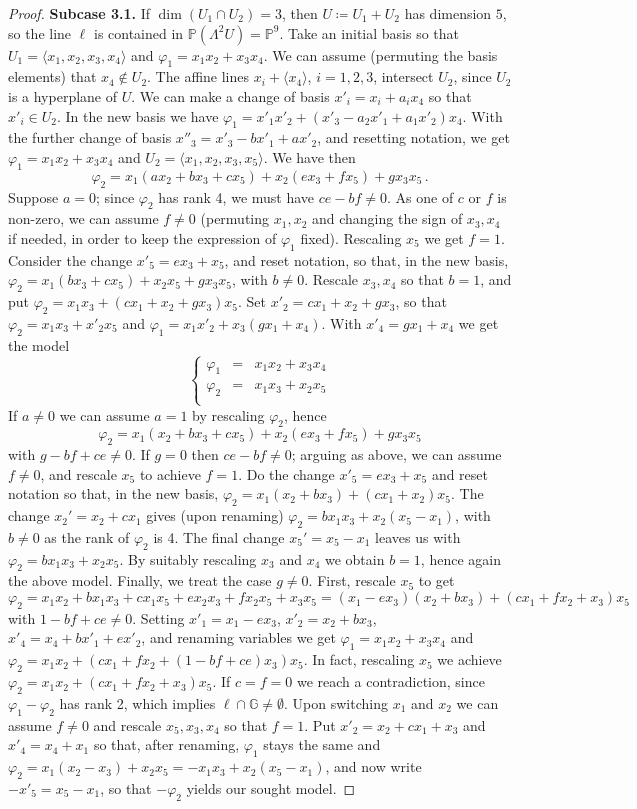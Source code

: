 \documentclass[10pt,reqno]{amsart}
\newcommand{\la}{\langle}
\newcommand{\ra}{\rangle}
\newcommand{\GG}{\mathbb{G}}
\newcommand{\RR}{\mathbb{R}}
\newcommand{\PP}{\mathbb P}
\newcommand{\f}{\varphi}
\renewcommand{\L}{\Lambda}
\theoremstyle{definition}
\begin{document}
\begin{proof}
\item \textbf{Subcase 3.1.} If $\dim(U_1 \cap U_2)=3$, then $U\coloneqq U_1 + U_2$ has dimension $5$, so the line $\ell$ is contained in $\PP(\L^2 U)=\PP^9$. Take an initial basis so that $U_1=\la x_1,x_2,x_3,x_4 \ra$ and $\f_1=x_1x_2+x_3x_4$. We can assume (permuting the basis elements) that $x_4 \notin U_2$. The affine lines $x_i + \la x_4 \ra$, $i=1,2,3$, intersect $U_2$, since $U_2$ is a hyperplane of $U$. We can make a change of basis $x'_i=x_i+a_i x_4$ so that $x'_i \in U_2$. In the new basis we have $\f_1=x'_1x'_2+(x'_3-a_2x'_1+a_1x'_2)x_4$. With the further change of basis $x''_3=x'_3-bx'_1+ax'_2$, and resetting notation, we get $\f_1=x_1x_2+x_3x_4$ and $U_2=\la x_1,x_2,x_3, x_5\ra$. 
We have then
\[
\f_2=x_1(ax_2+bx_3+cx_5)+x_2(ex_3+fx_5)+gx_3x_5\,.
\]
Suppose $a=0$; since $\f_2$ has rank 4, we must have $ce-bf\ne 0$. As one of $c$ or $f$ is non-zero, we can assume $f\ne 0$ (permuting $x_1,x_2$ and changing the sign of $x_3, x_4$ if needed, in order to keep the expression of $\f_1$ fixed). Rescaling $x_5$ we get $f=1$. Consider the change $x'_5=ex_3+x_5$, and reset notation, so that, in the new basis, $\f_2=x_1(bx_3+cx_5)+x_2x_5+gx_3x_5$, with $b \ne 0$. Rescale $x_3, x_4$ 
so that $b=1$, and put $\f_2=x_1x_3+(cx_1+x_2+gx_3)x_5$. Set $x'_2=cx_1+x_2+gx_3$, so that $\f_2=x_1x_3+x'_2x_5$ and $\f_1=x_1x'_2+x_3(gx_1+x_4)$. With $x'_4=gx_1+x_4$ we get the model
\[
\left\{\begin{array}{ccl}
 \f_1 & = & x_1x_2+x_3x_4\\
 \f_2 & = & x_1x_3+x_2x_5\\
\end{array}\right.
\]
If $a\neq 0$ we can assume $a=1$ by rescaling $\f_2$, hence
\[
\f_2=x_1(x_2+bx_3+cx_5)+x_2(ex_3+fx_5)+gx_3x_5
\]
with $g-bf+ce\neq0$. If $g=0$ then $ce-bf\neq0$; arguing as above, we can assume $f\neq 0$, and rescale $x_5$ to achieve $f=1$. Do the change $x'_5=ex_3+x_5$ and reset notation so that, in the new basis, $\f_2=x_1(x_2+bx_3)+(cx_1+x_2)x_5$. The change $x_2'=x_2+cx_1$ gives (upon renaming) $\f_2=bx_1x_3+x_2(x_5-x_1)$, with $b \ne 0$ as the rank of $\f_2$ is 4. The final change $x_5'=x_5-x_1$ leaves us with $\f_2=bx_1x_3+x_2x_5$. By suitably rescaling $x_3$ and $x_4$ we obtain $b=1$, hence again the above model. Finally, we treat the case $g \ne 0$. First, rescale $x_5$ to get
\[
\f_2=x_1x_2+bx_1x_3+cx_1x_5+ex_2x_3+fx_2x_5+x_3x_5=(x_1-ex_3)(x_2+bx_3)+(cx_1+fx_2+x_3)x_5
\]
with $1-bf+ce\neq 0$. Setting $x'_1=x_1-ex_3$, $x'_2=x_2+bx_3$, $x'_4=x_4+bx'_1+ex'_2$, and renaming variables we get $\f_1=x_1x_2+x_3x_4$ and $\f_2=x_1x_2+(cx_1+fx_2+(1-bf+ce)x_3)x_5$. In fact, rescaling $x_5$ we achieve $\f_2=x_1x_2+(cx_1+fx_2+x_3)x_5$. If $c=f=0$ we reach a contradiction, since $\f_1-\f_2$ has rank 2, which implies $\ell\cap\GG\neq\emptyset$. Upon switching $x_1$ and $x_2$ we can assume $f\neq 0$ and rescale $x_5, x_3, x_4$ so that $f=1$. Put $x'_2=x_2+cx_1+x_3$ and $x'_4=x_4+x_1$ so that, after renaming, $\f_1$ stays the same and $\f_2=x_1(x_2-x_3)+x_2x_5=-x_1x_3+x_2(x_5-x_1)$, and now write $-x'_5=x_5-x_1$, so that $-\f_2$ yields our sought model.



\end{proof}
\end{document}
